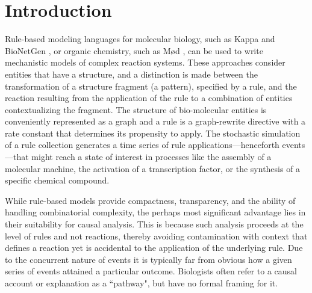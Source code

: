
\section{Introduction}\label{sec:intro}

Rule-based modeling languages for molecular biology, such as Kappa \cite{DanosEtAl-CONCUR07} and BioNetGen \cite{bngl}, or organic chemistry, such as M{\o}d \cite{moll}, can be used to write mechanistic models of complex reaction systems. These approaches consider entities that have a structure, and a distinction is made between the transformation of a structure fragment (a pattern), specified by a rule, and the reaction resulting from the application of the rule to a combination of entities contextualizing the fragment. The structure of bio-molecular entities is conveniently represented as a graph and a rule is a graph-rewrite directive with a rate constant that determines its propensity to apply. The stochastic simulation of a rule collection generates a time series of rule applications---henceforth events---that might reach a state of interest in processes like the assembly of a molecular machine, the activation of a transcription factor, or the synthesis of a specific chemical compound. 

% 

While rule-based models provide compactness, transparency, and the ability of handling combinatorial complexity, the perhaps most significant advantage lies in their suitability for causal analysis. This is because such analysis proceeds at the level of rules and not reactions, thereby avoiding contamination with context that defines a reaction yet is accidental to the application of the underlying rule. Due to the concurrent nature of events it is typically far from obvious how a given series of events attained a particular outcome. Biologists often refer to a causal account or explanation as a ``pathway", but have no formal framing for it.

